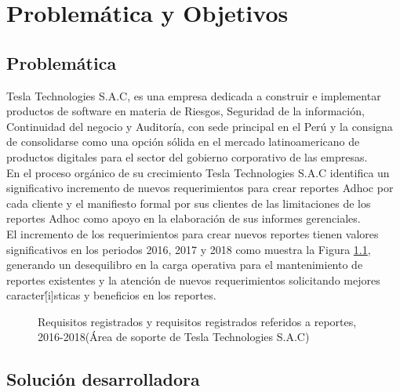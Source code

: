 \chapter{Problemática y Objetivos} \label{chapter:I}
\section{Problem\'{a}tica}
\begin{spacing}{1.5}
	
	Tesla Technologies S.A.C, es una empresa dedicada a construir e implementar productos de software en materia de Riesgos, Seguridad de la información, Continuidad del negocio y Auditoría, con sede principal en el Perú y la consigna de consolidarse como una opci\'{o}n s\'{o}lida en el mercado latinoamericano de productos digitales para el sector del gobierno corporativo de las empresas.\\	                         
	En el proceso org\'{a}nico de su crecimiento Tesla Technologies S.A.C  identifica un significativo incremento de nuevos requerimientos para crear reportes Adhoc por cada cliente y el manifiesto formal por sus clientes de las limitaciones de los reportes Adhoc como apoyo en la elaboraci\'{o}n de sus informes gerenciales.\\
	El incremento de los requerimientos para crear nuevos reportes tienen valores significativos en los periodos 2016, 2017 y 2018 como muestra la Figura \ref{figure:chaperI_1}, generando un desequilibro en la carga operativa para el mantenimiento de reportes existentes y la atenci\'{o}n de nuevos requerimientos solicitando mejores caracter\'[i]sticas y beneficios en los reportes.\\
	
	\begin{figure}[H]
		\begin{center}
			\tikzI
		\end{center}
		\caption {\centering \small{Requisitos registrados y requisitos registrados referidos a reportes,  2016-2018(\'{A}rea de soporte de Tesla Technologies S.A.C)}} \label{figure:chaperI_1}
	\end{figure}
	
\end{spacing}

\section{Soluci\'{o}n desarrolladora}
\begin{spacing}{1.5}
\end{spacing}
